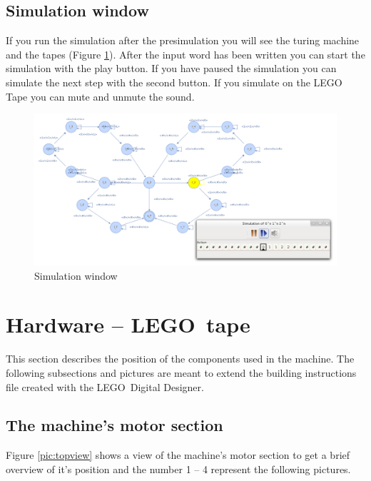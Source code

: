 \documentclass[%
  a4paper,%
  11pt,%
  blue,%
  hyperref	%
  ]{tubsartcl}
\begin{document}
\subsection{Simulation window}
If you run the simulation after the presimulation you will see the turing machine and the tapes (Figure \ref{pic:simulation_window}). After the input word has been written you can start the simulation with the play button. If you have paused the simulation you can simulate the next step with the second button. If you simulate on the LEGO Tape you can mute and unmute the sound.
\begin{figure}[!htb]
\begin{center}
\includegraphics[scale=0.35]{graphics_gui/simulation_window.png}
\end{center}
\caption{Simulation window}
\label{pic:simulation_window}
\end{figure}

\clearpage

\section{Hardware -- LEGO\textregistered\, tape}

This section describes the position of the components used in the machine. The following subsections and pictures are meant to extend the building instructions file created with the LEGO\textregistered\, Digital Designer.

\subsection{The machine's motor section}

Figure \ref{pic:topview} shows a view of the machine's motor section to get a brief overview of it's position and the number 1 -- 4 represent the following pictures.
\end{document}
